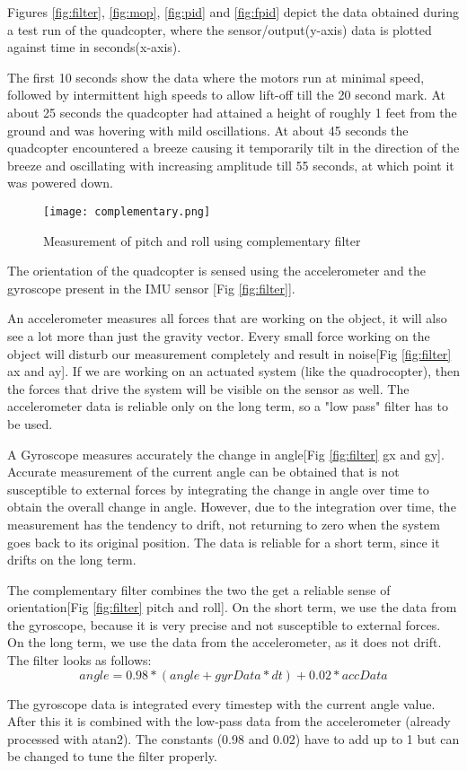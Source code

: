 Figures \ref{fig:filter}, \ref{fig:mop}, \ref{fig:pid} and \ref{fig:fpid} depict the data obtained during a test run of the quadcopter, where the sensor/output(y-axis) data is plotted against time in seconds(x-axis).
\par
The first 10 seconds show the data where the motors run at minimal speed, followed by intermittent high speeds to allow lift-off till the 20 second mark. At about 25 seconds the quadcopter had attained a height of roughly 1 feet from the ground and was hovering with mild oscillations. At about 45 seconds the quadcopter encountered a breeze causing it temporarily tilt in the direction of the breeze and oscillating with increasing amplitude till 55 seconds, at which point it was powered down.
\begin{figure}[H]
  \centering
  \texttt{[image: complementary.png]}
  \caption{Measurement of pitch and roll using complementary filter \label{fig:filter}}
  \label{Measurement of pitch and roll} 
\end{figure}
The orientation of the quadcopter is sensed using the accelerometer and the gyroscope present in the IMU sensor [Fig \ref{fig:filter}].
\par
An accelerometer measures all forces that are working on the object, it will also see a lot more than just the gravity vector. Every small force working on the object will disturb our measurement completely and result in noise[Fig \ref{fig:filter} ax and ay]. If we are working on an actuated system (like the quadrocopter), then the forces that drive the system will be visible on the sensor as well. The accelerometer data is reliable only on the long term, so a "low pass" filter has to be used.
\par
A Gyroscope measures accurately the change in angle[Fig \ref{fig:filter} gx and gy]. Accurate measurement of the current angle can be obtained that is not susceptible to external forces by integrating the change in angle over time to obtain the overall change in angle. However, due to the integration over time, the measurement has the tendency to drift, not returning to zero when the system goes back to its original position. The  data is reliable for a short term, since it drifts on the long term.
\par
The complementary filter combines the two the get a reliable sense of orientation[Fig \ref{fig:filter} pitch and roll]. On the short term, we use the data from the gyroscope, because it is very precise and not susceptible to external forces. On the long term, we use the data from the accelerometer, as it does not drift. The filter looks as follows:
\begin{equation}
angle = 0.98*(angle+gyrData*dt)+0.02*accData
\end{equation}
\par
The gyroscope data is integrated every timestep with the current angle value. After this it is combined with the low-pass data from the accelerometer (already processed with atan2). The constants (0.98 and 0.02) have to add up to 1 but can be changed to tune the filter properly.

